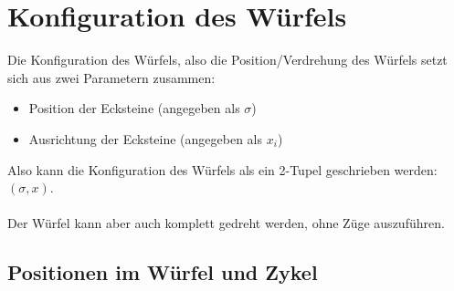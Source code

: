 \documentclass[12pt,a4paper, usenames, dvipsnames]{article}
\begin{document}









\section{Konfiguration des Würfels}
Die Konfiguration des Würfels, also die Position/Verdrehung des Würfels setzt sich aus zwei Parametern zusammen: \\
\begin{itemize}
\item Position der Ecksteine (angegeben als $\sigma$)
\item Ausrichtung der Ecksteine (angegeben als $x_i$)
\end{itemize}
Also kann die Konfiguration des Würfels als ein 2-Tupel geschrieben werden: $(\sigma, x)$. \\
\\
Der Würfel kann aber auch komplett gedreht werden, ohne Züge auszuführen.



















\subsection*{Positionen im Würfel und Zykel}
\end{document}
